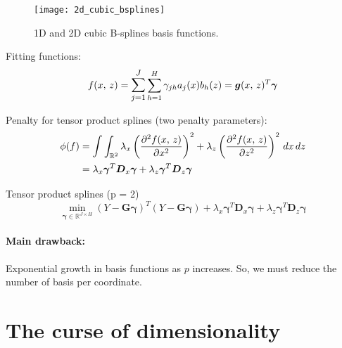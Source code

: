 \begin{figure}[H]
    \texttt{[image: 2d\_cubic\_bsplines]}
    \caption{1D and 2D cubic B-splines basis functions.}
\end{figure}

Fitting functions:
\begin{equation*}
    f(x,\,z) = \mathlarger{\sum_{j=1}^J} \sum_{h=1}^H \gamma_{jh} a_j(x) b_h(z) = \boldsymbol g(x,\,z)^T \boldsymbol\gamma
\end{equation*}

Penalty for tensor product splines (two penalty parameters):
\begin{align*}
    \phi(f) &= \mathlarger{\int} \int_{\mathbb R^2}
    \lambda_x \left( \frac{\partial^2 f(x,\,z)}{\partial x^2} \right)^2
    + \lambda_z \left( \frac{\partial^2 f(x,\,z)}{\partial z^2} \right)^2
    \, dx \, dz \\
            &= \lambda_x \boldsymbol \gamma^T \boldsymbol D_x \boldsymbol \gamma
            + \lambda_z \boldsymbol \gamma^T \boldsymbol D_z \boldsymbol \gamma
\end{align*}

\begin{problem}{Tensor product splines (p = 2)}{}
    \begin{equation*}
        \min_{\boldsymbol \gamma \in \mathds R^{J \times H}}
        \left(
            Y - \boldsymbol G\boldsymbol \gamma
        \right)^T
        \left(
            Y - \boldsymbol G\boldsymbol \gamma
        \right)
        + \lambda_x \boldsymbol \gamma^T \boldsymbol D_x \boldsymbol \gamma
        + \lambda_z \boldsymbol \gamma^T \boldsymbol D_z \boldsymbol \gamma
    \end{equation*}
    \tcblower
    \begin{note}
        \paragraph{Main drawback:} Exponential growth in basis functions as $p$ increases.
        So, we must reduce the number of basis per coordinate.
    \end{note}
\end{problem}

\pagebreak
\section{The curse of dimensionality}


